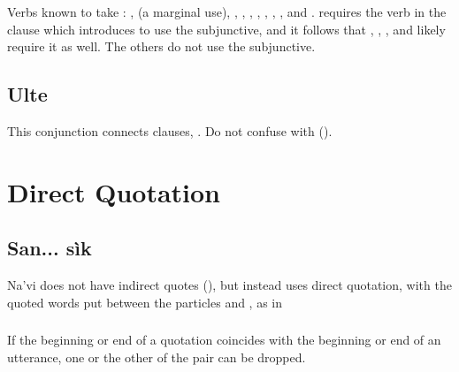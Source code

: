{\subsubsection{} Verbs known to take : ,
 (a marginal use), , , , , , , , and .   requires the verb in the clause which  introduces to use the subjunctive, and it follows that , , , and  likely require it as well.  The others do not use the subjunctive.

\subsubsection{} 

\subsection{Ulte} This conjunction connects clauses,  .  Do not confuse with 
().
\label{syn:ulte}



\section{Direct Quotation}
\label{syn:direct-quote}

\subsection{San... sìk} Na'vi does not have indirect quotes (), but instead uses direct
quotation, with the quoted words put between the particles  and
, as in  

\subsubsection{} If the beginning or end of a quotation coincides with
the beginning or end of an utterance, one or the other of the
 pair can be dropped.

}
